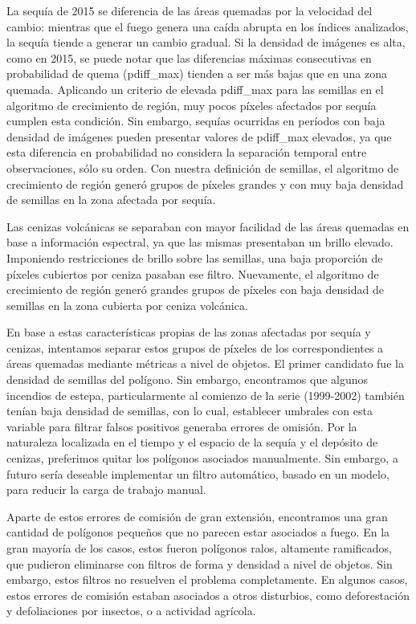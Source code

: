 \documentclass[11pt,a4paper]{article}
\begin{document}
La sequía de 2015 se diferencia de las áreas quemadas por la velocidad del cambio: mientras que el fuego genera una caída abrupta en los índices analizados, la sequía tiende a generar un cambio gradual. Si la densidad de imágenes es alta, como en 2015, se puede notar que las diferencias máximas consecutivas en probabilidad de quema (pdiff\_max) tienden a ser más bajas que en una zona quemada. Aplicando un criterio de elevada pdiff\_max para las semillas en el algoritmo de crecimiento de región, muy pocos píxeles afectados por sequía cumplen esta condición. Sin embargo, sequías ocurridas en períodos con baja densidad de imágenes pueden presentar valores de pdiff\_max elevados, ya que esta diferencia en probabilidad no considera la separación temporal entre observaciones, sólo su orden. Con nuestra definición de semillas, el algoritmo de crecimiento de región generó grupos de píxeles grandes y con muy baja densidad de semillas en la zona afectada por sequía.

Las cenizas volcánicas se separaban con mayor facilidad de las áreas quemadas en base a información espectral, ya que las mismas presentaban un brillo elevado. Imponiendo restricciones de brillo sobre las semillas, una baja proporción de píxeles cubiertos por ceniza pasaban ese filtro. Nuevamente, el algoritmo de crecimiento de región generó grandes grupos de píxeles con baja densidad de semillas en la zona cubierta por ceniza volcánica. 

En base a estas características propias de las zonas afectadas por sequía y cenizas, intentamos separar estos grupos de píxeles de los correspondientes a áreas quemadas mediante métricas a nivel de objetos. El primer candidato fue la densidad de semillas del polígono. Sin embargo, encontramos que algunos incendios de estepa, particularmente al comienzo de la serie (1999-2002) también tenían baja densidad de semillas, con lo cual, establecer umbrales con esta variable para filtrar falsos positivos generaba errores de omisión. Por la naturaleza localizada en el tiempo y el espacio de la sequía y el depósito de cenizas, preferimos quitar los polígonos asociados manualmente. Sin embargo, a futuro sería deseable implementar un filtro automático, basado en un modelo, para reducir la carga de trabajo manual.

Aparte de estos errores de comisión de gran extensión, encontramos una gran cantidad de polígonos pequeños que no parecen estar asociados a fuego. En la gran mayoría de los casos, estos fueron polígonos ralos, altamente ramificados, que pudieron eliminarse con filtros de forma y densidad a nivel de objetos. Sin embargo, estos filtros no resuelven el problema completamente. En algunos casos, estos errores de comisión estaban asociados a otros disturbios, como deforestación y defoliaciones por insectos, o a actividad agrícola. 
\end{document}
